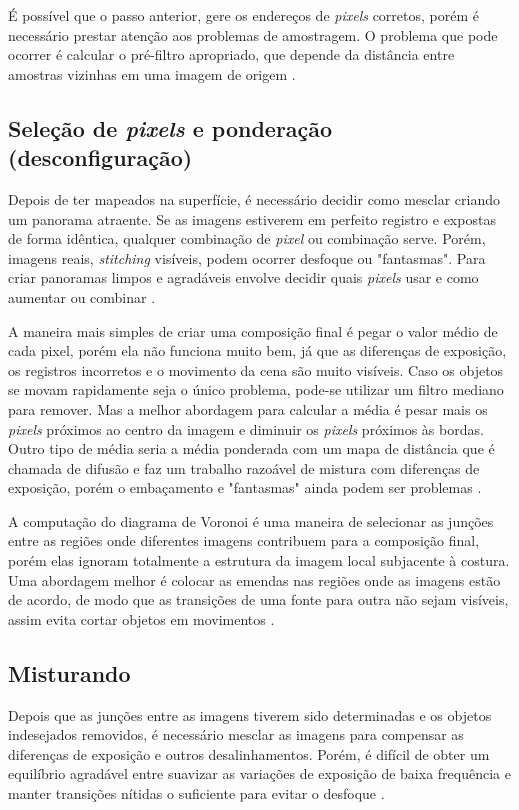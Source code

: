 \documentclass{article}
\begin{document}
É possível que o passo anterior, gere os endereços de \textit{pixels} corretos, porém é necessário prestar atenção aos problemas de amostragem. O problema que pode ocorrer é calcular o pré-filtro apropriado, que depende da distância entre amostras vizinhas em uma imagem de origem \cite{szeliski:2010}.

\subsection{Seleção de \textit{pixels} e ponderação (desconfiguração)}
Depois de ter mapeados na superfície, é necessário decidir como mesclar criando um panorama atraente. Se as imagens estiverem em perfeito registro e expostas de forma idêntica, qualquer combinação de \textit{pixel} ou combinação serve. Porém, imagens reais, \textit{stitching} visíveis, podem ocorrer desfoque ou "fantasmas". Para criar panoramas limpos e agradáveis envolve decidir quais \textit{pixels} usar e como aumentar ou combinar \cite{szeliski:2010}.

A maneira mais simples de criar uma composição final é pegar o valor médio de cada pixel, porém ela não funciona muito bem, já que as diferenças de exposição, os registros incorretos e o movimento da cena são muito visíveis. Caso os objetos se movam rapidamente seja o único problema, pode-se utilizar um filtro mediano para remover. Mas a melhor abordagem para calcular a média é pesar mais os \textit{pixels} próximos ao centro da imagem e diminuir os \textit{pixels} próximos às bordas. Outro tipo de média seria a média ponderada com um mapa de distância que é chamada de difusão e faz um trabalho razoável de mistura com diferenças de exposição, porém o embaçamento e "fantasmas" ainda podem ser problemas \cite{szeliski:2010}.

A computação do diagrama de Voronoi é uma maneira de selecionar as junções entre as regiões onde diferentes imagens contribuem para a composição final, porém elas ignoram totalmente a estrutura da imagem local subjacente à costura. Uma abordagem melhor é colocar as emendas nas regiões onde as imagens estão de acordo, de modo que as transições de uma fonte para outra não sejam visíveis, assim evita cortar objetos em movimentos \cite{szeliski:2010}.

\subsection{Misturando}
Depois que as junções entre as imagens tiverem sido determinadas e os objetos indesejados removidos, é necessário mesclar as imagens para compensar as diferenças de exposição e outros desalinhamentos. Porém, é difícil de obter um equilíbrio agradável entre suavizar as variações de exposição de baixa frequência e manter transições nítidas o suficiente para evitar o desfoque \cite{szeliski:2010}.
\end{document}
